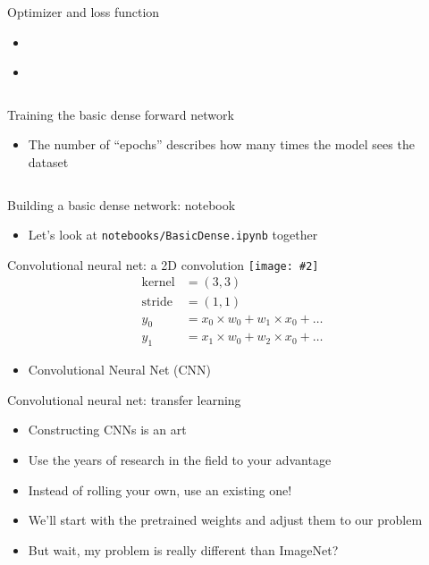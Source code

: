 \documentclass[hyperref={pdfpagelabels=false},12pt]{beamer}
\newcommand{\ig}[2]{\texttt{[image: \#2]}}
\newcommand{\namedUrl}[2]{\href{#1}{\color{blue}{#2}}}
\newcommand{\pygment}[3]{\inputminted[bgcolor=lightgray,linenos,fontsize=#1]{#2}{#3}}
\begin{document}
\begin{frame}{Optimizer and loss function}
  \begin{itemize}
    \item \namedUrl{https://arxiv.org/abs/1412.6980}{Adam Optimizer}
    \item \namedUrl{https://pytorch.org/docs/stable/nn.html\#crossentropyloss}{Cross Entropy Loss}
  \end{itemize}
  \pygment{\scriptsize}{python}{code/optimizer-loss-fn.py}
\end{frame}

\begin{frame}{Training the basic dense forward network}
  \begin{itemize}
    \item The number of ``epochs'' describes how many times the model sees the dataset
  \end{itemize}
  \pygment{\scriptsize}{python}{code/training-dense-model.py}
\end{frame}

\begin{frame}{Building a basic dense network: notebook}
  \begin{itemize}
    \item Let's look at \texttt{notebooks/BasicDense.ipynb} together
  \end{itemize}
\end{frame}

\begin{frame}{Convolutional neural net: a 2D convolution}
  \centering
  \ig{0.75}{figures/convolution.png}
  \begin{align*}
    \mathrm{kernel} &= (3, 3) \\
    \mathrm{stride} &= (1, 1) \\
    y_0 &= x_0 \times w_0 + w_1 \times x_0 + \dots \\
    y_1 &= x_1 \times w_0 + w_2 \times x_0 + \dots
  \end{align*}
  \begin{itemize}
    \item Convolutional Neural Net (CNN)
  \end{itemize}
\end{frame}

\begin{frame}{Convolutional neural net: transfer learning}
  \begin{itemize}
    \item Constructing CNNs is an art
    \item Use the years of research in the field to your advantage
    \item Instead of rolling your own, use an existing one!
    \item We'll start with the pretrained weights and adjust them to our problem
    \item But wait, my problem is really different than ImageNet?
  \end{itemize}
\end{frame}
\end{document}
